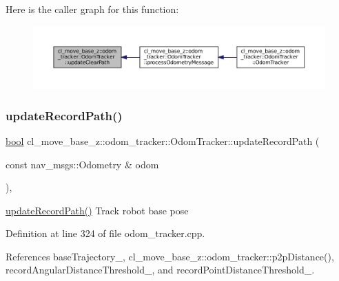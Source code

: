 Here is the caller graph for this function\+:
\nopagebreak
\begin{figure}[H]
\begin{center}
\leavevmode
\includegraphics[width=350pt]{classcl__move__base__z_1_1odom__tracker_1_1OdomTracker_abe7ba4dbf014e1f2c64b5806ce42c073_icgraph}
\end{center}
\end{figure}
\mbox{\label{classcl__move__base__z_1_1odom__tracker_1_1OdomTracker_a77a66083573c6bef726d77447fb53349}} 
\subsubsection{\texorpdfstring{update\+Record\+Path()}{updateRecordPath()}}
{\footnotesize\ttfamily \hyperlink{classbool}{bool} cl\+\_\+move\+\_\+base\+\_\+z\+::odom\+\_\+tracker\+::\+Odom\+Tracker\+::update\+Record\+Path (\begin{DoxyParamCaption}\item[{const nav\+\_\+msgs\+::\+Odometry \&}]{odom }\end{DoxyParamCaption})\hspace{0.3cm}{\ttfamily [protected]}, {\ttfamily [virtual]}}

\hyperlink{classcl__move__base__z_1_1odom__tracker_1_1OdomTracker_a77a66083573c6bef726d77447fb53349}{update\+Record\+Path()} Track robot base pose 

Definition at line 324 of file odom\+\_\+tracker.\+cpp.



References base\+Trajectory\+\_\+, cl\+\_\+move\+\_\+base\+\_\+z\+::odom\+\_\+tracker\+::p2p\+Distance(), record\+Angular\+Distance\+Threshold\+\_\+, and record\+Point\+Distance\+Threshold\+\_\+.



